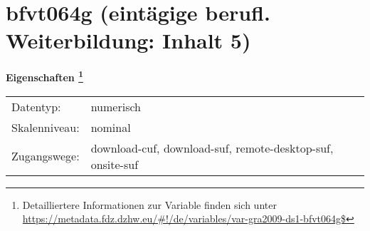 
    \setcounter{footnote}{0}

    \vspace*{-1.8cm}
	\section{bfvt064g (eintägige berufl. Weiterbildung: Inhalt 5)}
	\label{section:bfvt064g}



    \vspace*{0.5cm}
    \noindent\textbf{Eigenschaften
	\footnote{Detailliertere Informationen zur Variable finden sich unter
		\url{https://metadata.fdz.dzhw.eu/\#!/de/variables/var-gra2009-ds1-bfvt064g$}}}\\
	\begin{tabularx}{\hsize}{@{}lX}
	Datentyp: & numerisch \\
	Skalenniveau: & nominal \\
	Zugangswege: &
	  download-cuf, 
	  download-suf, 
	  remote-desktop-suf, 
	  onsite-suf
 \\
    \end{tabularx}




